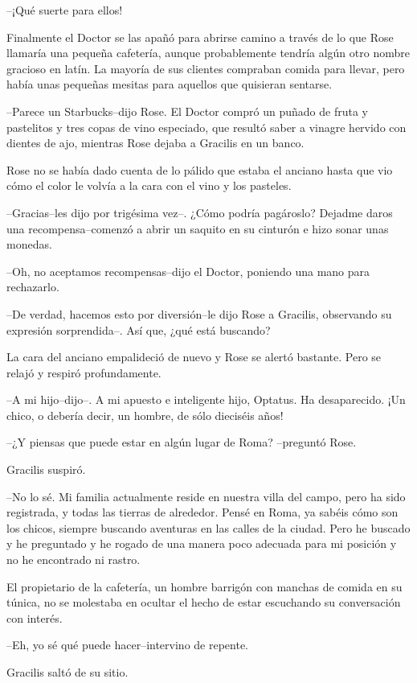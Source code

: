 --¡Qué suerte para ellos!

Finalmente el Doctor se las apañó para abrirse camino a través de lo que
Rose llamaría una pequeña cafetería, aunque probablemente tendría algún
otro nombre gracioso en latín. La mayoría de sus clientes compraban
comida para llevar, pero había unas pequeñas mesitas para aquellos que
quisieran sentarse.

--Parece un Starbucks--dijo Rose. El Doctor compró un puñado de fruta y
pastelitos y tres copas de vino especiado, que resultó saber a vinagre
hervido con dientes de ajo, mientras Rose dejaba a Gracilis en un banco.

Rose no se había dado cuenta de lo pálido que estaba el anciano hasta
que vio cómo el color le volvía a la cara con el vino y los pasteles.

--Gracias--les dijo por trigésima vez--. ¿Cómo podría pagároslo? Dejadme
daros una recompensa--comenzó a abrir un saquito en su cinturón e hizo
sonar unas monedas.

--Oh, no aceptamos recompensas--dijo el Doctor, poniendo una mano para
rechazarlo.

--De verdad, hacemos esto por diversión--le dijo Rose a Gracilis,
observando su expresión sorprendida--. Así que, ¿qué está buscando?

La cara del anciano empalideció de nuevo y Rose se alertó bastante. Pero
se relajó y respiró profundamente.

--A mi hijo--dijo--. A mi apuesto e inteligente hijo, Optatus. Ha
desaparecido. ¡Un chico, o debería decir, un hombre, de sólo dieciséis
años!

--¿Y piensas que puede estar en algún lugar de Roma? --preguntó Rose.

Gracilis suspiró.

--No lo sé. Mi familia actualmente reside en nuestra villa del campo,
pero ha sido registrada, y todas las tierras de alrededor. Pensé en
Roma, ya sabéis cómo son los chicos, siempre buscando aventuras en las
calles de la ciudad. Pero he buscado y he preguntado y he rogado de una
manera poco adecuada para mi posición y no he encontrado ni rastro.

El propietario de la cafetería, un hombre barrigón con manchas de comida
en su túnica, no se molestaba en ocultar el hecho de estar escuchando su
conversación con interés.

--Eh, yo sé qué puede hacer--intervino de repente.

Gracilis saltó de su sitio.

